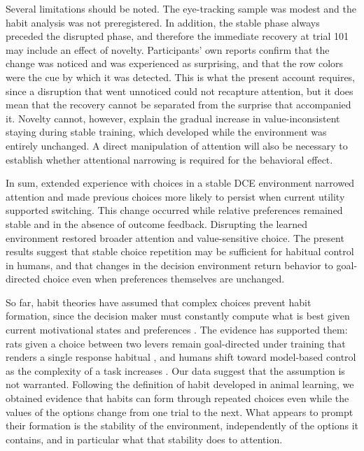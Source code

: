 \documentclass[man,natbib,floatsintext]{apa7}
\begin{document}
Several limitations should be noted. The eye-tracking sample was modest and the habit analysis was not preregistered. In addition, the stable phase always preceded the disrupted phase, and therefore the immediate recovery at trial 101 may include an effect of novelty. Participants' own reports confirm that the change was noticed and was experienced as surprising, and that the row colors were the cue by which it was detected. This is what the present account requires, since a disruption that went unnoticed could not recapture attention, but it does mean that the recovery cannot be separated from the surprise that accompanied it. Novelty cannot, however, explain the gradual increase in value-inconsistent staying during stable training, which developed while the environment was entirely unchanged. A direct manipulation of attention will also be necessary to establish whether attentional narrowing is required for the behavioral effect.

In sum, extended experience with choices in a stable DCE environment narrowed attention and made previous choices more likely to persist when current utility supported switching. This change occurred while relative preferences remained stable and in the absence of outcome feedback. Disrupting the learned environment restored broader attention and value-sensitive choice. The present results suggest that stable choice repetition may be sufficient for habitual control in humans, and that changes in the decision environment return behavior to goal-directed choice even when preferences themselves are unchanged.

So far, habit theories have assumed that complex choices prevent habit formation, since the decision maker must constantly compute what is best given current motivational states and preferences \citep{Kosaki2010,daw2005}. The evidence has supported them: rats given a choice between two levers remain goal-directed under training that renders a single response habitual \citep{Kosaki2010}, and humans shift toward model-based control as the complexity of a task increases \citep{kim2019}. Our data suggest that the assumption is not warranted. Following the definition of habit developed in animal learning, we obtained evidence that habits can form through repeated choices even while the values of the options change from one trial to the next. What appears to prompt their formation is the stability of the environment, independently of the options it contains, and in particular what that stability does to attention.
\end{document}
